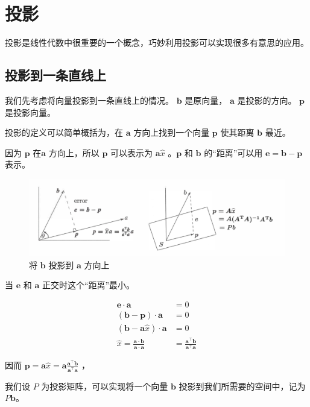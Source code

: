 \section{投影}

投影是线性代数中很重要的一个概念，巧妙利用投影可以实现很多有意思的应用。



\subsection{投影到一条直线上}


我们先考虑将向量投影到一条直线上的情况。 $\mathbf b$ 是原向量， $\mathbf a$ 是投影的方向。 $\mathbf p$ 是投影向量。

投影的定义可以简单概括为，在 $\mathbf a$ 方向上找到一个向量 $\mathbf p$ 使其距离 $\mathbf b$ 最近。

因为 $\mathbf p$ 在$\mathbf a$ 方向上，所以 $\mathbf p$ 可以表示为 $\mathbf a \hat x$ 。$\mathbf p$ 和 $\mathbf b$ 的“距离”可以用 $\mathbf e=\mathbf b-\mathbf p$ 表示。

\begin{figure}[h]
	\centering
	\includegraphics[width=0.7\linewidth]{../img/screenshot002}
	\caption{将 $\mathbf b$ 投影到 $\mathbf a$ 方向上}
	\label{image_line_projection}
\end{figure}

当 $\mathbf e$ 和 $\mathbf a$ 正交时这个“距离”最小。

$$
\begin{aligned}
\mathbf e\cdot\mathbf a&=0\\
(\mathbf b-\mathbf p)\cdot\mathbf a&=0\\
(\mathbf b-\mathbf a\hat x)\cdot\mathbf a&=0\\
\hat x=\frac{\mathbf a\cdot\mathbf b}{\mathbf a\cdot\mathbf a}&=\frac{\mathbf a^\top\mathbf b}{\mathbf a^\top\mathbf a}
\end{aligned}
$$

因而 $\mathbf p=\mathbf a\hat x =\mathbf a\frac{\mathbf a^\top\mathbf b}{\mathbf a^\top\mathbf a}$ ，

我们设 $P$ 为投影矩阵，可以实现将一个向量 $\mathbf b$ 投影到我们所需要的空间中，记为 $P\mathbf b$。


